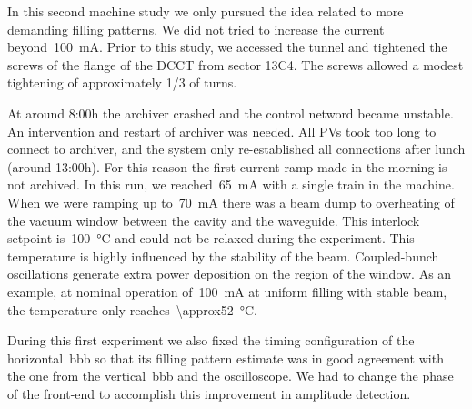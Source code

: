 \documentclass[a4paper,
               biblatex,     %
               ]{jacow}
\begin{document}
In this second machine study we only pursued the idea related to more demanding filling patterns. We did not tried to increase the current beyond~\SI{100}{\milli\ampere}. Prior to this study, we accessed the tunnel and tightened the screws of the flange of the DCCT from sector 13C4. The screws allowed a modest tightening of approximately 1/3 of turns.

At around 8:00h the archiver crashed and the control netword became unstable. An intervention and restart of archiver was needed. All PVs took too long to connect to archiver, and the system only re-established all connections after lunch (around 13:00h). For this reason the first current ramp made in the morning is not archived. In this run, we reached~\SI{65}{\milli\ampere} with a single train in the machine. When we were ramping up to~\SI{70}{\milli\ampere} there was a beam dump to overheating of the vacuum window between the cavity and the waveguide. This interlock setpoint is~\SI{100}{\celsius} and could not be relaxed during the experiment. This temperature is highly influenced by the stability of the beam. Coupled-bunch oscillations generate extra power deposition on the region of the window. As an example, at nominal operation of~\SI{100}{\milli\ampere} at uniform filling with stable beam, the temperature only reaches~\SI{\approx52}{\celsius}.

During this first experiment we also fixed the timing configuration of the horizontal~\gls{bbb} so that its filling pattern estimate was in good agreement with the one from the vertical~\gls{bbb} and the oscilloscope. We had to change the phase of the front-end to accomplish this improvement in amplitude detection.
\end{document}
